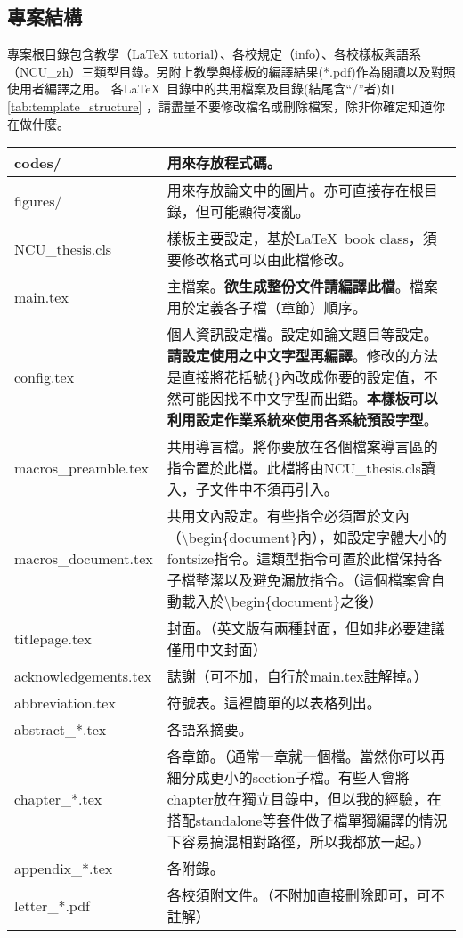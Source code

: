 \documentclass[class=NCU_thesis, crop=false, float=true]{standalone}
\begin{document}
\subsection{專案結構}
\label{sec:s_template_structure}
專案根目錄包含教學（LaTeX tutorial）、各校規定（info）、各校樣板與語系（NCU\_zh）三類型目錄。另附上教學與樣板的編譯結果(*.pdf)作為閱讀以及對照使用者編譯之用。
各\LaTeX\ 目錄中的共用檔案及目錄(結尾含``/''者)如\cref{tab:template_structure} ，請盡量不要修改檔名或刪除檔案，除非你確定知道你在做什麼。
\let\tnote\tptabletnote
\begin{table}
    \centering
    \begin{threeparttable}
    \begin{tabularx}{\textwidth}{| l | X |}
        \hline
        codes/  & 用來存放程式碼。 \\ \hline
        figures/    & 用來存放論文中的圖片。亦可直接存在根目錄，但可能顯得凌亂。 \\ \hline
        NCU\_thesis.cls & 樣板主要設定，基於\LaTeX\ book class，須要修改格式可以由此檔修改。 \\ \hline
        main.tex & 主檔案。\textbf{欲生成整份文件請編譯此檔}。檔案用於定義各子檔（章節）順序。  \\ \hline
        config.tex & 個人資訊設定檔。設定如論文題目等設定。\textbf{請設定使用之中文字型再編譯}。修改的方法是直接將花括號\{\}內改成你要的設定值\tnote{a}，不然可能因找不中文字型而出錯。\textbf{本樣板可以利用設定作業系統來使用各系統預設字型}。  \\ \hline
        macros\_preamble.tex & 共用導言檔。將你要放在各個檔案導言區\tnote{b}的指令置於此檔。此檔將由NCU\_thesis.cls讀入，子文件中不須再引入。  \\ \hline
        macros\_document.tex & 共用文內設定。有些指令必須置於文內（\textbackslash{}begin\{document\}內），如設定字體大小的fontsize指令。這類型指令可置於此檔保持各子檔整潔以及避免漏放指令。（這個檔案會自動載入於\textbackslash{}begin\{document\}之後）  \\ \hline
        titlepage.tex & 封面。（英文版有兩種封面，但如非必要建議僅用中文封面）  \\ \hline
        acknowledgements.tex & 誌謝（可不加，自行於main.tex註解掉。）  \\ \hline
        abbreviation.tex & 符號表。這裡簡單的以表格列出。\tnote{c}  \\ \hline
        abstract\_*.tex & 各語系摘要。  \\ \hline
        chapter\_*.tex & 各章節。（通常一章就一個檔。當然你可以再細分成更小的section子檔。\tnote{d}有些人會將chapter放在獨立目錄中，但以我的經驗，在搭配standalone等套件做子檔單獨編譯的情況下容易搞混相對路徑，所以我都放一起。）  \\ \hline
        appendix\_*.tex & 各附錄。  \\ \hline
        letter\_*.pdf & 各校須附文件。（不附加直接刪除即可，可不註解）  \\ \hline
    \end{tabularx}
    

\end{threeparttable}
\end{table}
\end{document}
